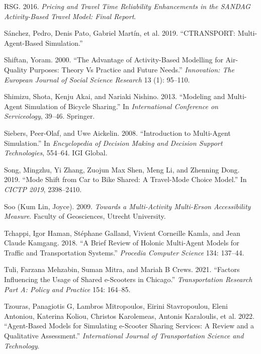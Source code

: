 \documentclass[12pt, oneside, openright]{byuthesis}
\newlength{\cslhangindent}
\newlength{\cslentryspacingunit} %
\newenvironment{CSLReferences}[2] %
 {%
  \setlength{\parindent}{0pt}
  \ifodd #1
  \let\oldpar\par
  \def\par{\hangindent=\cslhangindent\oldpar}
  \fi
  \setlength{\parskip}{#2\cslentryspacingunit}
 }%
 {}
\begin{document}
\begin{CSLReferences}{1}{0}
\leavevmode{}%
RSG. 2016. \emph{Pricing and Travel Time Reliability Enhancements in the SANDAG Activity-Based Travel Model: Final Report}.

\leavevmode{}%
Sánchez, Pedro, Denis Pato, Gabriel Martín, et al. 2019. {``CTRANSPORT: Multi-Agent-Based Simulation.''}

\leavevmode{}%
Shiftan, Yoram. 2000. {``The Advantage of Activity-Based Modelling for Air-Quality Purposes: Theory Vs Practice and Future Needs.''} \emph{Innovation: The European Journal of Social Science Research} 13 (1): 95--110.

\leavevmode{}%
Shimizu, Shota, Kenju Akai, and Nariaki Nishino. 2013. {``Modeling and Multi-Agent Simulation of Bicycle Sharing.''} In \emph{International Conference on Serviceology}, 39--46. Springer.

\leavevmode{}%
Siebers, Peer-Olaf, and Uwe Aickelin. 2008. {``Introduction to Multi-Agent Simulation.''} In \emph{Encyclopedia of Decision Making and Decision Support Technologies}, 554--64. IGI Global.

\leavevmode{}%
Song, Mingzhu, Yi Zhang, Zuojun Max Shen, Meng Li, and Zhenning Dong. 2019. {``Mode Shift from Car to Bike Shared: A Travel-Mode Choice Model.''} In \emph{CICTP 2019}, 2398--2410.

\leavevmode{}%
Soo (Kum Lin, Joyce). 2009. \emph{Towards a Multi-Activity Multi-Erson Accessibility Measure}. Faculty of Geosciences, Utrecht University.

\leavevmode{}%
Tchappi, Igor Haman, Stéphane Galland, Vivient Corneille Kamla, and Jean Claude Kamgang. 2018. {``A Brief Review of Holonic Multi-Agent Models for Traffic and Transportation Systems.''} \emph{Procedia Computer Science} 134: 137--44.

\leavevmode{}%
Tuli, Farzana Mehzabin, Suman Mitra, and Mariah B Crews. 2021. {``Factors Influencing the Usage of Shared e-Scooters in Chicago.''} \emph{Transportation Research Part A: Policy and Practice} 154: 164--85.

\leavevmode{}%
Tzouras, Panagiotis G, Lambros Mitropoulos, Eirini Stavropoulou, Eleni Antoniou, Katerina Koliou, Christos Karolemeas, Antonis Karaloulis, et al. 2022. {``Agent-Based Models for Simulating e-Scooter Sharing Services: A Review and a Qualitative Assessment.''} \emph{International Journal of Transportation Science and Technology}.


\end{CSLReferences}
\end{document}
